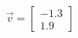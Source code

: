 \documentclass[preview]{standalone}
\begin{document}
\begin{align*}
\vec{v}=\begin{bmatrix}-1.3\\1.9\end{bmatrix}
\end{align*}
\end{document}

